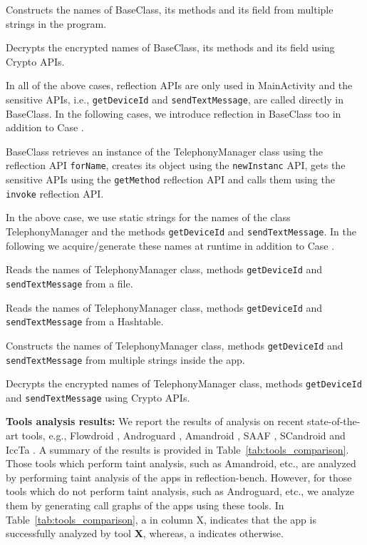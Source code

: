 \begin{description}[style=unboxed,leftmargin=0cm]
\item {} Constructs the names of BaseClass, its methods and its field from multiple strings in the program.

\item {} Decrypts the encrypted names of BaseClass, its methods and its field using Crypto APIs.

In all of the above cases, reflection APIs are only used in MainActivity and the sensitive APIs, i.e., \texttt{getDeviceId} and \texttt{sendTextMessage}, are called directly in BaseClass. In the following cases, we introduce reflection in BaseClass too in addition to Case .

\item {} BaseClass retrieves  an instance of the TelephonyManager class using the reflection API \texttt{forName}, creates its object using the \texttt{newInstanc} API, gets the sensitive APIs using the \texttt{getMethod} reflection API and calls them using the \texttt{invoke} reflection API.

In the above case, we use static strings for the names of the class TelephonyManager and the methods \texttt{getDeviceId} and \texttt{sendTextMessage}. In the following we acquire/generate these names at runtime in addition to Case .

\item {} Reads the names of TelephonyManager class, methods \texttt{getDeviceId} and \texttt{sendTextMessage} from a file. 

\item {} Reads the names of TelephonyManager class, methods \texttt{getDeviceId} and \texttt{sendTextMessage} from a Hashtable. 

\item {} Constructs the names of TelephonyManager class, methods \texttt{getDeviceId} and \texttt{sendTextMessage} from multiple strings inside the app.

\item {} Decrypts the encrypted names of TelephonyManager class, methods \texttt{getDeviceId} and \texttt{sendTextMessage} using Crypto APIs.


\end{description}

\textbf{Tools analysis results:} We report the results of analysis on recent state-of-the-art tools, e.g., Flowdroid \cite{FlowDroid_Arzt2014}, Androguard \cite{AndroGuard_webpage}, Amandroid \cite{wei2014amandroid}, SAAF \cite{Saaf_Hoffmann2013}, SCandroid \cite{fuchs2009scandroid} and IccTa \cite{li2015iccta}. A summary of the results is provided in Table~\ref{tab:tools_comparison}. Those tools which perform taint analysis, such as Amandroid, etc., are analyzed by performing taint analysis of the apps in reflection-bench. However, for those tools which do not perform taint analysis, such as Androguard, etc., we analyze them by generating call graphs of the apps using these tools. In Table~\ref{tab:tools_comparison}, a  in column X, indicates that the app is successfully analyzed by tool \textbf{X}, whereas, a  indicates otherwise.

